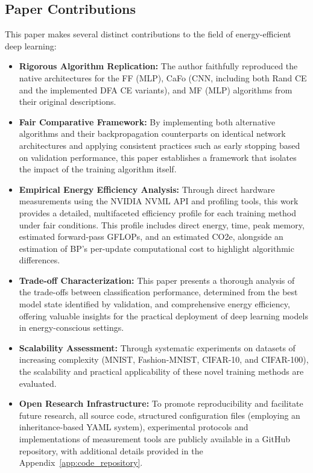\subsection{Paper Contributions}
\label{sec:contributions}

This paper makes several distinct contributions to the field of energy-efficient deep learning:
\begin{itemize}
    \item \textbf{Rigorous Algorithm Replication:} The author faithfully reproduced the native architectures for the FF (MLP), CaFo (CNN, including both Rand CE and the implemented DFA CE variants), and MF (MLP) algorithms from their original descriptions.

    \item \textbf{Fair Comparative Framework:} By implementing both alternative algorithms and their backpropagation counterparts on identical network architectures and applying consistent practices such as early stopping based on validation performance, this paper establishes a framework that isolates the impact of the training algorithm itself.

    \item \textbf{Empirical Energy Efficiency Analysis:} Through direct hardware measurements using the NVIDIA NVML API and profiling tools, this work provides a detailed, multifaceted efficiency profile for each training method under fair conditions. This profile includes direct energy, time, peak memory, estimated forward-pass GFLOPs, and an estimated CO2e, alongside an estimation of BP's per-update computational cost to highlight algorithmic differences.

    \item \textbf{Trade-off Characterization:} This paper presents a thorough analysis of the trade-offs between classification performance, determined from the best model state identified by validation, and comprehensive energy efficiency, offering valuable insights for the practical deployment of deep learning models in energy-conscious settings.

    \item \textbf{Scalability Assessment:} Through systematic experiments on datasets of increasing complexity (MNIST, Fashion-MNIST, CIFAR-10, and CIFAR-100), the scalability and practical applicability of these novel training methods are evaluated.

    \item \textbf{Open Research Infrastructure:} To promote reproducibility and facilitate future research, all source code, structured configuration files (employing an inheritance-based YAML system), experimental protocols and implementations of measurement tools are publicly available in a GitHub repository, with additional details provided in the Appendix~\ref{app:code_repository}.
\end{itemize}

